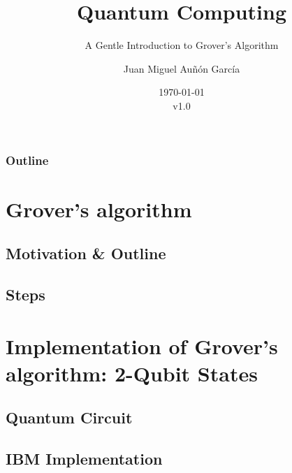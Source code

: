 \documentclass[aspectratio=169]{beamer}
\title[Quantum Computing: Shor's]{Quantum Computing}
\subtitle{A Gentle Introduction to Grover's Algorithm}
\date{\today\\ v1.0}
\author[jmaunon]{Juan Miguel Au\~n\'on Garc\'ia}
\begin{document}
\begin{frame}
\titlepage
\end{frame}


\begin{frame}[plain]
\frametitle{Outline}
\tableofcontents

\end{frame}


%


\section{Grover's algorithm}


\subsection{Motivation \& Outline}



\subsection{Steps}





\section{Implementation of Grover's algorithm: 2-Qubit States}
\subsection{Quantum Circuit}

\subsection{IBM Implementation}
%
\end{document}
